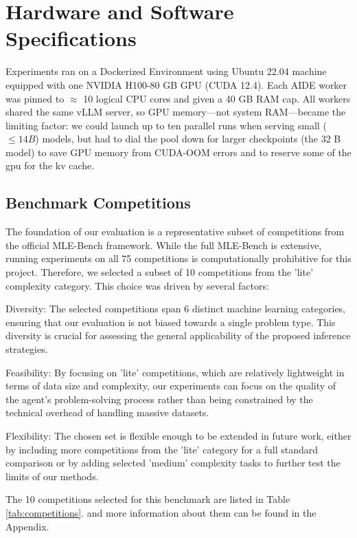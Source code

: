\section{Hardware and Software Specifications}

Experiments ran on a Dockerized Environment using Ubuntu 22.04 machine equipped with one NVIDIA H100-80 GB GPU (CUDA 12.4). Each AIDE worker was pinned to $\approx$ 10 logical CPU cores and given a 40 GB RAM cap. All workers shared the same vLLM server, so GPU memory—not system RAM—became the limiting factor: we could launch up to ten parallel runs when serving small ($\leq 14 B$) models, but had to dial the pool down for larger checkpoints (the 32 B model) to save GPU memory from CUDA-OOM errors and to reserve some of the gpu for the kv cache.


\subsection{Benchmark Competitions}

The foundation of our evaluation is a representative subset of competitions from the official MLE-Bench framework. While the full MLE-Bench is extensive, running experiments on all 75 competitions is computationally prohibitive for this project. Therefore, we selected a subset of 10 competitions from the 'lite' complexity category. This choice was driven by several factors:

Diversity: The selected competitions span 6 distinct machine learning categories, ensuring that our evaluation is not biased towards a single problem type. This diversity is crucial for assessing the general applicability of the proposed inference strategies. 

Feasibility: By focusing on 'lite' competitions, which are relatively lightweight in terms of data size and complexity, our experiments can focus on the quality of the agent's problem-solving process rather than being constrained by the technical overhead of handling massive datasets.

Flexibility: The chosen set is flexible enough to be extended in future work, either by including more competitions from the 'lite' category for a full standard comparison or by adding selected 'medium' complexity tasks to further test the limits of our methods.

The 10 competitions selected for this benchmark are listed in Table \ref{tab:competitions}. and more information about them can be found in the Appendix.

